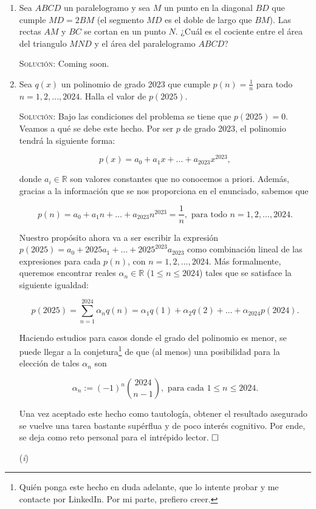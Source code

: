 \documentclass{article}
\begin{document}
\begin{enumerate}
    \item Sea $ABCD$ un paralelogramo y sea $M$ un punto en la diagonal $BD$ que cumple $MD = 2BM$ (el segmento $MD$ es el doble de largo que $BM$).
    Las rectas $AM$ y $BC$ se cortan en un punto $N$. ¿Cuál es el cociente entre el área del triangulo $MND$ y el área del paralelogramo $ABCD$?

    \textsc{Solución}: Coming soon.

    \item Sea $q(x)$ un polinomio de grado 2023 que cumple $p(n) = \frac{1}{n}$ para todo $n = 1, 2, ..., 2024$. Halla el valor de $p(2025)$.

    \textsc{Solución}: Bajo las condiciones del problema se tiene que $p(2025) = 0$. Veamos a qué se debe este hecho. Por ser $p$ de grado 2023, el polinomio tendrá la siguiente forma:

    \[p(x) = a_0 + a_1x + \dots + a_{2023}x^{2023},\]

    donde $a_i \in \mathbb{R}$ son valores constantes que no conocemos a priori. Además, gracias a la información que se nos proporciona en el enunciado, sabemos que

    \[p(n) = a_0 + a_1n + \dots + a_{2023}n^{2023} = \frac{1}{n}, \text{ para todo $n = 1, 2, ..., 2024$}.\]

    Nuestro propósito ahora va a ser escribir la expresión $p(2025) = a_0 + 2025a_1 + \dots + 2025^{2023}a_{2023}$ como combinación lineal de las expresiones para cada $p(n)$, con $n = 1, 2, ..., 2024$.
    Más formalmente, queremos encontrar reales $\alpha_n \in \mathbb{R}$ ($1 \leq n \leq 2024$) tales que se satisface la siguiente igualdad:

    \[p(2025) = \sum_{n = 1}^{2024} \alpha_nq(n) = \alpha_1q(1) + \alpha_2q(2) + \dots + \alpha_{2024}p(2024).\]

    Haciendo estudios para casos donde el grado del polinomio es menor, se puede llegar a la conjetura\footnote{Quién ponga este hecho en duda adelante, que lo intente probar y me contacte por LinkedIn. Por mi parte, prefiero creer.} de que (al menos) una posibilidad para la elección de tales $\alpha_n$ son

    \[\alpha_n := (-1)^{n} \binom{2024}{n-1}, \text{ para cada $1 \leq n \leq 2024$.}\]

    Una vez aceptado este hecho como tautología, obtener el resultado asegurado se vuelve una tarea bastante supérflua y de poco interés cognitivo. Por ende, se deja como reto personal para el intrépido lector. $\hfill\square$

    \item[(\textit{i})]
\end{enumerate}
\end{document}
